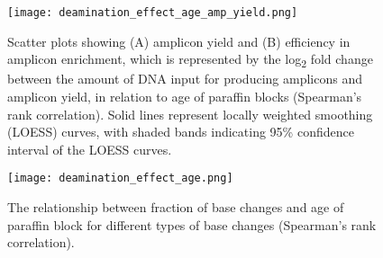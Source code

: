 \newpage
\begin{figure}[H]
	\centering
	\texttt{[image: deamination\_effect\_age\_amp\_yield.png]}
	\caption[Scatter plots showing (A) amplicon yield and (B) efficiency in amplicon enrichment, which is represented by the log\textsubscript{2} fold change between the amount of DNA input for producing amplicons and amplicon yield, in relation to age of paraffin blocks (Spearman's rank correlation).]{Scatter plots showing (A) amplicon yield and (B) efficiency in amplicon enrichment, which is represented by the log\textsubscript{2} fold change between the amount of DNA input for producing amplicons and amplicon yield, in relation to age of paraffin blocks (Spearman's rank correlation). Solid lines represent locally weighted smoothing (LOESS) curves, with shaded bands indicating 95\% confidence interval of the LOESS curves.}
	\label{fig:deamination_effect_age_amp_yield}
\end{figure}


\begin{figure}[H]
	\centering
	\texttt{[image: deamination\_effect\_age.png]}
	\caption{The relationship between fraction of base changes and age of paraffin block for different types of base changes (Spearman's rank correlation).}
	\label{fig:deamination_effect_age}
\end{figure}


